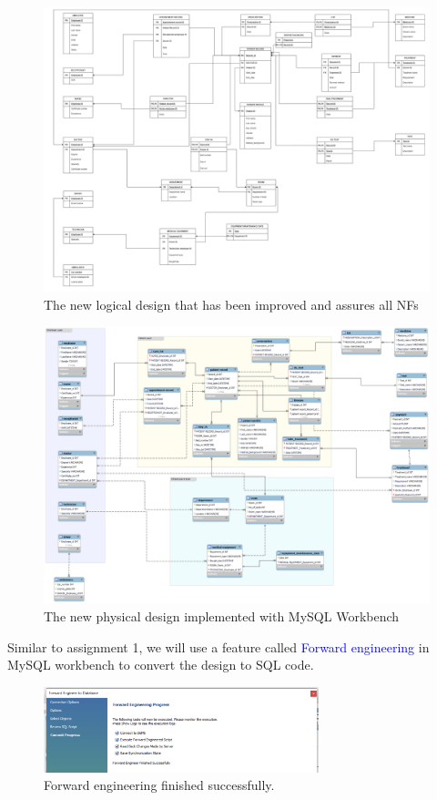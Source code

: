 \documentclass[a4paper]{article}
\numberwithin{equation}{section}
\begin{document}
\begin{figure}[H]
  \centering
  \includegraphics[width = 12cm ]{assets/newLogicalDesign.png}
  \captionsetup{justification=centering,margin=2cm}
  \caption{The new logical design that has been improved and assures all NFs}
\end{figure}

\newpage
\begin{figure}[H]
  \centering
  \includegraphics[width = 12cm]{assets/New_logcial_design.png}
  \captionsetup{justification=centering,margin=2cm}
  \caption{The new physical design implemented with MySQL Workbench}
\end{figure}

Similar to assignment 1, we will use a feature called \textcolor{blue}{Forward engineering } in MySQL workbench to convert the design to SQL code.

\begin{figure}[H]
  \centering
  \includegraphics[width = 8cm]{assets/step2.png}
  \captionsetup{justification=centering,margin=2cm}
  \caption{Forward engineering finished successfully.}
\end{figure}
\end{document}
